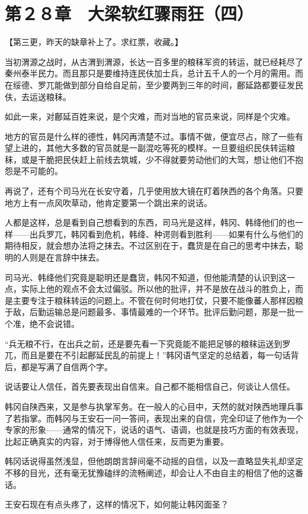 \section{第２８章　大梁软红骤雨狂（四）}

【第三更，昨天的缺章补上了。求红票，收藏。】

当初渭源之战时，从古渭到渭源，长达一百多里的粮秣军资的转运，就已经耗尽了秦州泰半民力。而且那只是要维持连民伕加士兵，总计五千人的一个月的需用。而在绥德、罗兀能做到部分自给自足前，至少要两到三年的时间，鄜延路都要征发民伕，去运送粮秣。

如此一来，对鄜延百姓来说，是个灾难，而对当地的官员来说，同样是个灾难。

地方的官员是什么样的德性，韩冈再清楚不过。事情不做，便宜尽占，除了一些有望上进的，其他大多数的官员就是一副混吃等死的模样。一旦要组织民伕转运粮秣，或是干脆把民伕赶上前线去筑城，少不得就要劳动他们的大驾，想让他们不抱怨是不可能的。

再说了，还有个司马光在长安守着，几乎使用放大镜在盯着陕西的各个角落。只要地方上有一点风吹草动，他肯定要第一个跳出来的说话。

人都是这样，总是看到自己想看到的东西，司马光是这样，韩冈、韩绛他们的也一样——出兵罗兀，韩冈看到危机，韩绛、种谔则看到胜利——如果有什么与他们的期待相反，就会想办法将之抹去。不过区别在于，蠢货是在自己的思考中抹去，聪明的人则是在言辞中抹去。

司马光、韩绛他们究竟是聪明还是蠢货，韩冈不知道，但他能清楚的认识到这一点，实际上他的观点不会太过偏驳。所以他的批评，并不是放在战斗的胜负上，而是主要专注于粮秣转运的问题上。不管在何时何地打仗，只要不能像蕃人那样因粮于敌，后勤运输总是问题最多、事情最难的一个环节。批评后勤问题，那是一批一个准，绝不会说错。

“兵无粮不行，在出兵之前，还是要先看一下究竟能不能把足够的粮秣运送到罗兀，而且是要在不引起鄜延民乱的前提上！”韩冈语气坚定的总结着，每一句话背后，都是写满了自信两个字。

说话要让人信任，首先要表现出自信来。自己都不能相信自己，何谈让人信任。

韩冈自陕西来，又是参与执掌军务。在一般人的心目中，天然的就对陕西地理兵事了若指掌。而韩冈与王安石一问一答间，表现出来的自信，完全印证了他作为一个专家的形象——通常的情况下，说话的语气、语调，也就是技巧方面的有效表现，比起正确真实的内容，对于博得他人信任来，反而更为重要。

韩冈话说得虽然浅显，但他朗朗言辞间毫不动摇的自信，以及一直略显失礼却坚定不移的目光，还有毫无犹豫磕绊的流畅阐述，却会让人不由自主的相信了他的这番话。

王安石现在有点头疼了，这样的情况下，如何能让韩冈面圣？

